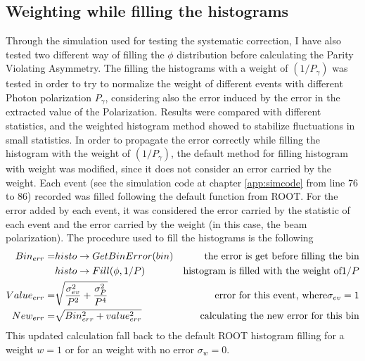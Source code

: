 \subsection{Weighting while filling the histograms} \label{sec:weighthisto}
Through the simulation used for testing the systematic correction, I have also tested two different way of filling the $\phi$ distribution before calculating the Parity Violating Asymmetry. The filling the histograms with a weight of $(1/P_{\gamma})$ was tested in order to try to normalize the weight of different events with different Photon polarization  $P_{\gamma}$, considering also the error induced by the error in the extracted value of the Polarization. Results were compared with different statistics, and the weighted histogram method showed to stabilize fluctuations in small statistics. In order to propagate the error correctly while filling the histogram with the weight of $(1/P_{\gamma})$, the default method for filling histogram with weight was modified, since it does not consider an error carried by the weight.
Each event (see the simulation code at chapter \ref{app:simcode} from line 76 to 86) recorded was filled following the default function from ROOT. For the error added by each event, it was considered the error carried by the statistic of each event and the error carried by the weight (in this case, the beam polarization). The procedure used to fill the histograms is the following 
\begin{align}
  Bin_{err} = & histo\rightarrow GetBinError(bin) &  \textnormal{the error is get before filling the bin} \\
  &  histo\rightarrow Fill(\phi,1/P) & \textnormal{histogram is filled with the weight of} 1/P \\
  Value_{err} = & \sqrt{\frac{\sigma_{ev}^2}{P^2} + \frac{\sigma_P^2}{P^4}} & \textnormal{error for this event, where} \sigma_{ev}=1 \\
  New_{err} = & \sqrt{Bin_{err}^2 + value_{err}^2} & \textnormal{calculating the new error for this bin}
\end{align}
This updated calculation fall back to the default ROOT histogram filling for a weight $w=1$ or for an weight with no error $\sigma_w = 0$.

